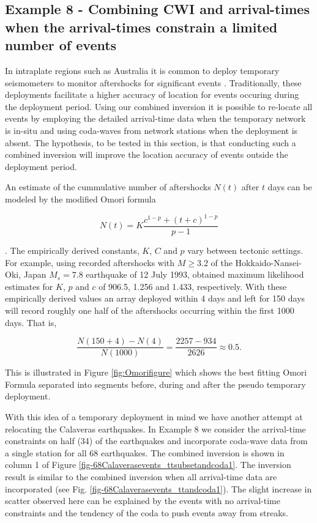 \documentclass[12pt,double]{article}
\begin{document}
\subsection*{Example 8 - Combining CWI and arrival-times when the arrival-times constrain a limited number of events}

In intraplate regions such as Australia it is common to deploy
temporary seismometers to monitor aftershocks for significant events
\citep{dr_Bowman90a, dr_Leonard02a}. Traditionally, these
deployments facilitate a higher accuracy of location for events
occuring during the deployment period. Using our combined inversion
it is possible to re-locate all events by employing the detailed
arrival-time data when the temporary network is in-situ and using
coda-waves from network stations when the deployment is absent. The
hypothesis, to be tested in this section, is that conducting such a
combined inversion will improve the location accuracy of events
outside the deployment period.

An estimate of the cummulative number of aftershocks $N(t)$ after
$t$ days can be modeled by the modified Omori formula
\begin{linenomath*} \begin{equation}
\label{eq:CumOmori}
 N(t) = K \frac{c^{1-p} + (t+c)^{1-p}}{p-1}
\end{equation} \end{linenomath*}
\citep{dr_Utsu95a}.
The empirically derived constants, $K$, $C$ and $p$ vary between
tectonic settings. For example, using recorded aftershocks with
$M\ge3.2$ of the  Hokkaido-Nansei-Oki, Japan $M_s=7.8$ earthquake of
12 July 1993, \citet{dr_Utsu95a} obtained maximum likelihood
estimates for $K$, $p$ and $c$ of 906.5, 1.256 and 1.433,
respectively.  With these empirically derived values an array
deployed within 4 days and left for 150 days will record roughly one
half of the aftershocks occurring within the first 1000 days. That
is,
\begin{linenomath*} \begin{equation}
\frac{N(150+4)-N(4)}{N(1000)} = \frac{2257-934}{2626} \approx 0.5.
\end{equation} \end{linenomath*}
This is illustrated in Figure \ref{fig:Omorifigure} which shows
the best fitting Omori Formula separated into segments before, during 
and after the pseudo temporary
deployment.

With this idea of a temporary deployment in mind we have another
attempt at relocating the Calaveras earthquakes. In Example 8 we
consider the arrival-time constraints on half (34) of the earthquakes
and incorporate coda-wave data from a single station for all 68
earthquakes. The combined inversion is shown in column 1 of Figure
\ref{fig-68Calaverasevents_ttsubsetandcoda1}. The inversion result
is similar to the combined inversion when all arrival-time data are
incorporated (see Fig. \ref{fig-68Calaverasevents_ttandcoda1}). The
slight increase in scatter observed here can be explained by the
events with no arrival-time constraints and the tendency of the coda
to push events away from streaks.
\end{document}
